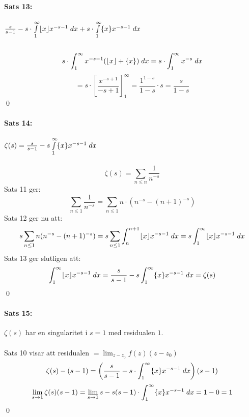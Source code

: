 \documentclass{article}
\DeclarePairedDelimiter{\floor}{\lfloor}{\rfloor}
\DeclarePairedDelimiter{\fpart} { \{ } { \} }
\begin{document}
\paragraph{Sats 13:} $\frac {s} {s - 1} - s \cdot \int\limits_1^\infty \floor{x} x^{-s - 1} \; dx +
		s \cdot \int\limits_1^\infty \fpart{x} x^{-s - 1} \; dx$ \\
\\
\[
	s \cdot \int_1^\infty x^{-s - 1} (\floor{x} + \fpart{x}) \; dx = s \cdot \int_1^\infty x^{-s} \; dx
\]
\[
	= s \cdot \left [
		\frac {x^{-s + 1}} {-s + 1}
	\right ]_1^\infty =
	\frac {1^{1 - s}} {1 - s} \cdot s = \frac {s} {1 - s}
\]
\hfill \qed
\\
\paragraph{Sats 14:} $\zeta(s) = \frac {s} {s - 1} - s \int\limits_1^\infty \fpart{x} x^{-s - 1} \; dx$\\
\\
\[
	\zeta(s) = \sum_{n \leq n} \frac {1} {n^{-s}}
\]
Sats 11 ger:
\[
	\sum_{n \leq 1} \frac {1} {n^{-s}} = \sum_{n \leq 1} n \cdot (n^{-s} - (n + 1)^{-s})
\]
Sats 12 ger nu att:
\[
	s \sum_{n \leq 1} n (n^{-s} - (n + 1)^{-s}) = s \sum_{n \leq 1} \int_n^{n + 1} \floor{x} x^{-s -1} \; dx =
		s \int_1^\infty \floor{x} x^{-s - 1} \; dx
\]
Sats 13 ger slutligen att:
\[
	\int_1^\infty \floor{x} x^{-s - 1} \; dx = \frac {s} {s - 1} - s \int_1^\infty \fpart{x} x^{-s - 1} \; dx = \zeta(s)
\]
\hfill \qed
\\
\paragraph{Sats 15:} $\zeta(s)$ har en singularitet i $s = 1$ med residualen $1$.\\
\\
Sats 10 visar att residualen $= \lim_{z - z_0} f(z)(z - z_0)$
\[
	\zeta(s) - (s - 1) = \left (
		\frac {s} {s - 1} - s \cdot \int_1^\infty \fpart{x} x^{-s - 1} \; dx 
	\right )
	(s - 1)
\]
\[
	\lim_{s \to 1} \zeta(s)(s - 1) = \lim_{s \to 1} s - s (s - 1) \cdot \int_1^\infty \fpart{x} x^{-s - 1} \; dx =
		1 - 0 = 1
\]
\hfill \qed
\end{document}
